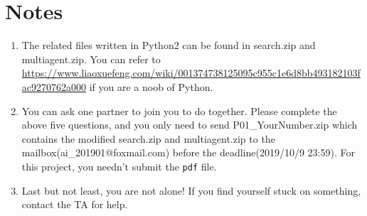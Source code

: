 \documentclass[a4paper, 11pt]{article}
\begin{document}
\section{Notes}
\begin{enumerate}\setlength{\itemsep}{-\itemsep}
  \item The related files written in Python2 can be found in \textsf{search.zip} and \textsf{multiagent.zip}. You can refer to \url{https://www.liaoxuefeng.com/wiki/001374738125095c955c1e6d8bb493182103fac9270762a000} if you are a noob of Python.
\item You can ask one partner to join you to do together. Please complete the above five questions, and you only need to send \textsf{P01\_YourNumber.zip} which contains the modified \textsf{search.zip} and \textsf{multiagent.zip} to the mailbox(\textsf{ai\_201901@foxmail.com}) before the deadline(2019/10/9 23:59). For this project, you needn't submit the \texttt{pdf} file.
\item Last but not least, you are not alone! If you find yourself stuck on something, contact the TA for help.

\end{enumerate}
\end{document}
